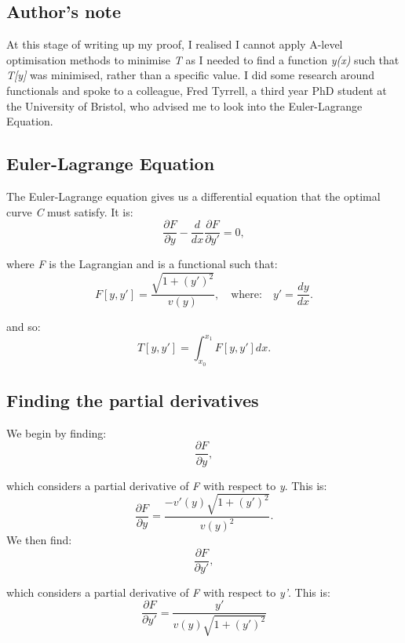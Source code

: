 \documentclass{article}
\begin{document}
\subsection{Author's note}
At this stage of writing up my proof, I realised I cannot apply A-level optimisation methods to minimise \textit{T} as I needed to find a function \textit{y(x)} such that \textit{T[y]} was minimised, rather than a specific value. I did some research around functionals and spoke to a colleague, Fred Tyrrell, a third year PhD student at the University of Bristol, who advised me to look into the Euler-Lagrange Equation. 
\subsection{Euler-Lagrange Equation}
The Euler-Lagrange equation gives us a differential equation that the optimal curve \textit{C} must satisfy. It is: 
\begin{equation}
    \frac{\partial F}{\partial y} - \frac{d}{dx}\frac{\partial F}{\partial y'} = 0,
\end{equation}

where \textit{F} is the Lagrangian and is a functional such that:
\begin{equation}
    F[y,y'] = \frac{\sqrt{1 + \left(y'\right)^2}}{v(y)}, \quad \text{where:} \quad y' = \frac{dy}{dx}.
\end{equation}

and so: 
\begin{equation}
    T[y, y'] = \int_{x_0}^{x_1} F[y,y'] dx.
\end{equation}
\subsection{Finding the partial derivatives}
We begin by finding:
\begin{equation}
    \frac{\partial F}{\partial y},
\end{equation}

which considers a partial derivative of \textit{F} with respect to \textit{y}. This is:
\begin{equation}
    \frac{\partial F}{\partial y} = \frac{-v'(y) \sqrt{1+\left(y'\right)^2}}{v(y)^2}.
\end{equation}
We then find:
\begin{equation}
    \frac{\partial F}{\partial y'},
\end{equation}

which considers a partial derivative of \textit{F} with respect to \textit{y'}. This is:
\begin{equation}
    \frac{\partial F}{\partial y'} = \frac{y'}{v(y) \sqrt{1+\left(y'\right)^2}}
\end{equation}
\end{document}
